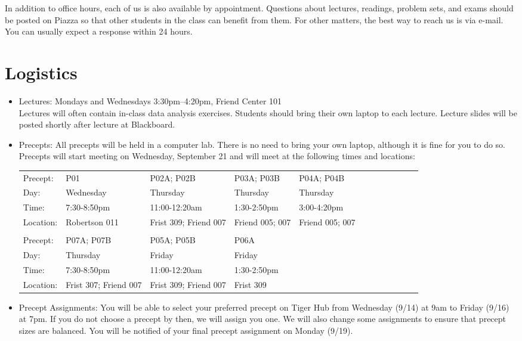 \documentclass[11pt]{article}
\begin{document}
In addition to office hours, each of us is also available by
appointment.  Questions about lectures, readings, problem sets, and
exams should be posted on \textsf{Piazza} so that other students in
the class can benefit from them.  For other matters, the best way to
reach us is via e-mail.  You can usually expect a response within 24
hours.

\section{Logistics}
\begin{itemize}

\item Lectures: Mondays and Wednesdays 3:30pm--4:20pm, Friend Center 101 \\
  Lectures will often contain in-class data analysis exercises.
  Students should bring their own laptop to each lecture.  Lecture
  slides will be posted shortly after lecture at Blackboard.

\item Precepts: All precepts will be held in a computer lab. There is
  no need to bring your own laptop, although it is fine for you to do
  so. Precepts will start meeting on Wednesday, September 21 and will
  meet at the following times and locations:
  \\

\begin{adjustwidth}{-3.0em}{0.0em}
\begin{center}
\begin{tabular}{llllllllllll}	
  Precept: & P01 & P02A; P02B & P03A; P03B & P04A; P04B \\
  Day: & Wednesday & Thursday & Thursday & Thursday\\
  Time: & 7:30-8:50pm & 11:00-12:20am & 1:30-2:50pm & 3:00-4:20pm \\
  Location: & Robertson 011 & Frist 309; Friend 007 & Friend 005; 007 & Friend 005; 007 \\
  \\
  Precept: & P07A; P07B & P05A; P05B & P06A\\
  Day: & Thursday & Friday & Friday  \\
  Time: & 7:30-8:50pm & 11:00-12:20am & 1:30-2:50pm\\
  Location: & Frist 307; Friend 007 & Frist 309; Friend 007 & Frist 309 \\
\end{tabular}
\end{center}
\end{adjustwidth}

\item Precept Assignments: You will be able to select your preferred
  precept on Tiger Hub from Wednesday (9/14) at 9am to Friday (9/16)
  at 7pm. If you do not choose a precept by then, we will assign you
  one. We will also change some assignments to ensure that precept
  sizes are balanced. You will be notified of your final precept
  assignment on Monday (9/19).
\end{itemize}
\end{document}
